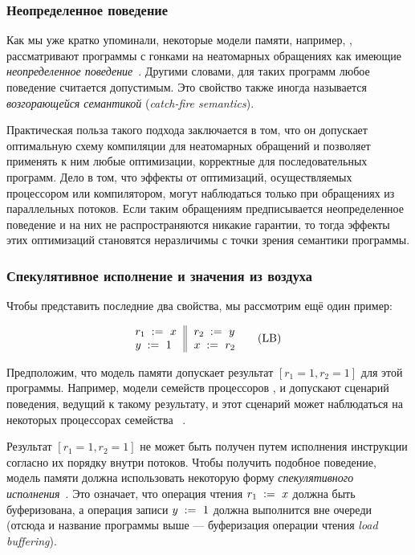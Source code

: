 \subsubsection{Неопределенное поведение}
\label{sec:background:ub}

Как мы уже кратко упоминали, некоторые модели памяти, например, \CPP, рассматривают программы с гонками 
на неатомарных обращениях как имеющие 
\emph{неопределенное поведение}~\cite{Boehm-Adve:PLDI08}.
Другими словами, для таких программ любое поведение считается допустимым. 
Это свойство также иногда называется 
\emph{возгорающейся семантикой} (\emph{catch-fire semantics}).
 
Практическая польза такого подхода заключается в том,
что он допускает оптимальную схему компиляции для 
неатомарных обращений и позволяет применять к ним 
любые оптимизации, корректные для последовательных программ.
Дело в том, что эффекты от оптимизаций, осуществляемых процессором или компилятором, могут наблюдаться 
только при обращениях из параллельных потоков. 
Если таким обращениям предписывается неопределенное поведение и на них 
не распространяются никакие гарантии, 
то тогда эффекты этих оптимизаций 
становятся неразличимы с точки зрения семантики программы. 
 
\subsubsection{Спекулятивное исполнение и значения из воздуха}
\label{sec:background:oota}

Чтобы представить последние два свойства, мы рассмотрим ещё один пример:

\begin{equation*}
\inarrII{
  \readInst{}{r_1}{x}     \\
  \writeInst{}{y}{1}      \\
}{
  \readInst{}{r_2}{y}     \\
  \writeInst{}{x}{r_2}    \\
}
\tag{LB}\label{ex:lb}
\end{equation*}

Предположим, что модель памяти допускает 
результат ${[r_1=1, r_2=1]}$ для этой программы. 
Например, модели семейств процессоров 
,  и \POWER
допускают  сценарий поведения, ведущий к такому результату, 
и этот сценарий может наблюдаться на некоторых процессорах семейства 
~\cite{Maranget-al:Tutorial2012}.

Результат ${[r_1=1, r_2=1]}$ не может быть получен 
путем исполнения инструкции согласно их порядку внутри потоков.
Чтобы получить подобное поведение, 
модель памяти должна  использовать 
некоторую форму \emph{спекулятивного исполнения}~\cite{Boudol-Petri:ESOP10, Boehm-Demsky:MSPC14}.
Это означает, что  операция чтения $r_1\;:=_{}\;x$
должна быть буферизована, а операция записи $y\;:=_{}\;1$ 
должна выполнится вне очереди 
(отсюда и название программы выше --- 
буферизация операции чтения \emph{load buffering}).

